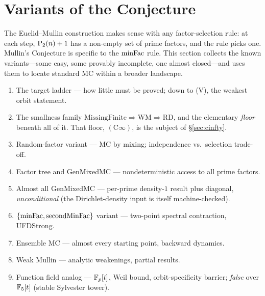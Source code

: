 \section{Variants of the Conjecture}
\label{sec:variants}

The Euclid--Mullin construction makes sense with any factor-selection
rule: at each step, $\mathrm{P}_{2}(n)+1$ has a non-empty set of prime
factors, and the rule picks one.  Mullin's Conjecture is specific to
the $\mathrm{minFac}$ rule.  This section collects the known variants---some
easy, some provably incomplete, one almost closed---and uses them to
locate standard MC within a broader landscape.

\begin{roadmap}
\begin{enumerate}[nosep,leftmargin=*]
\item[\S\ref{sec:target-ladder}] The target ladder --- how little must be proved; down to (V), the weakest orbit statement.
\item[\S\ref{sec:composite-floor}] The smallness family $\mathrm{MissingFinite} \Rightarrow \mathrm{WM} \Rightarrow \mathrm{RD}$, and the elementary \emph{floor} beneath all of it.  That floor, $(\mathrm{C}\infty)$, is the subject of \S\ref{sec:cinfty}.
\item[\S\ref{sec:random-variant}] Random-factor variant --- MC by mixing; independence vs.\ selection trade-off.
\item[\S\ref{sec:factor-tree}] Factor tree and GenMixedMC --- nondeterministic access to all prime factors.
\item[\S\ref{sec:almost-all-mixed}] Almost all GenMixedMC --- per-prime density-$1$ result plus diagonal, \emph{unconditional} (the Dirichlet-density input is itself machine-checked).
\item[\S\ref{sec:minfac-secondminfac}] $\{\mathrm{minFac},\operatorname{secondMinFac}\}$ variant --- two-point spectral contraction, UFDStrong.
\item[\S\ref{sec:ensemble-variant}] Ensemble MC --- almost every starting point, backward dynamics.
\item[\S\ref{sec:weak-mullin}] Weak Mullin --- analytic weakenings, partial results.
\item[\S\ref{sec:function-field}] Function field analog --- $\mathbb{F}_p[t]$, Weil bound, orbit-specificity barrier; \emph{false} over $\mathbb{F}_5[t]$ (stable Sylvester tower).
\end{enumerate}
\end{roadmap}

